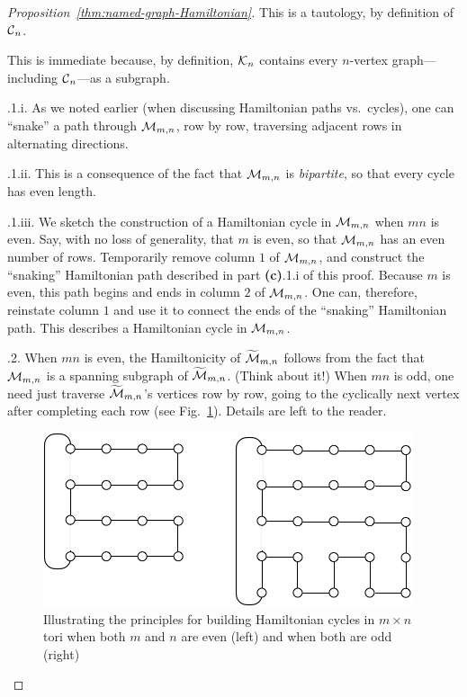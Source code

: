 \begin{proof}[Proposition~\ref{thm:named-graph-Hamiltonian}]
This is a tautology, by definition of $\mbox{$\cal C$}_n$.

\medskip

This is immediate because, by definition, $\mbox{$\cal K$}_n$ contains every $n$-vertex graph---including $\mbox{$\cal C$}_n$---as a subgraph.

\medskip

.1.i.
As we noted earlier (when discussing Hamiltonian paths vs.~cycles), one can ``snake'' a path through $\mbox{$\cal M$}_{m,n}$, row by row, traversing adjacent rows in alternating directions.

\smallskip


.1.ii.
This is a consequence of the fact that $\mbox{$\cal M$}_{m,n}$ is {\it bipartite}, so that every cycle has even length.

\smallskip

.1.iii.
We sketch the construction of a Hamiltonian cycle in $\mbox{$\cal M$}_{m,n}$ when $mn$ is even.  Say, with no loss of generality, that $m$ is even, so that $\mbox{$\cal M$}_{m,n}$ has an even number of rows.  Temporarily remove column $1$ of $\mbox{$\cal M$}_{m,n}$, and construct the ``snaking'' Hamiltonian path described in part {\bf (c)}.1.i of this proof.  Because $m$ is even, this path begins and ends in column $2$ of $\mbox{$\cal M$}_{m,n}$.  One can, therefore, reinstate column $1$ and use it to connect the ends of the ``snaking'' Hamiltonian path.  This describes a Hamiltonian cycle in $\mbox{$\cal M$}_{m,n}$.

\smallskip

.2.
When $mn$ is even, the Hamiltonicity of $\widetilde{\mbox{$\cal M$}}_{m,n}$ follows from the fact that $\mbox{$\cal M$}_{m,n}$ is a spanning subgraph of $\widetilde{\mbox{$\cal M$}}_{m,n}$.  (Think about it!)  When $mn$ is odd, one need just traverse $\widetilde{\mbox{$\cal M$}}_{m,n}$'s vertices row by row, going to the cyclically next vertex after completing each row (see Fig.~\ref{fig:HamiltonTorus}).  Details are left to the reader.
\begin{figure}[hbt]
\begin{center}
       \includegraphics[scale=0.45]{FiguresGraph/HamiltonTorus}
\caption{Illustrating the principles for building Hamiltonian cycles in $m \times n$ tori when both $m$ and $n$ are even (left) and when both are odd (right)}
  \label{fig:HamiltonTorus}
\end{center}
\end{figure}


\end{proof}
